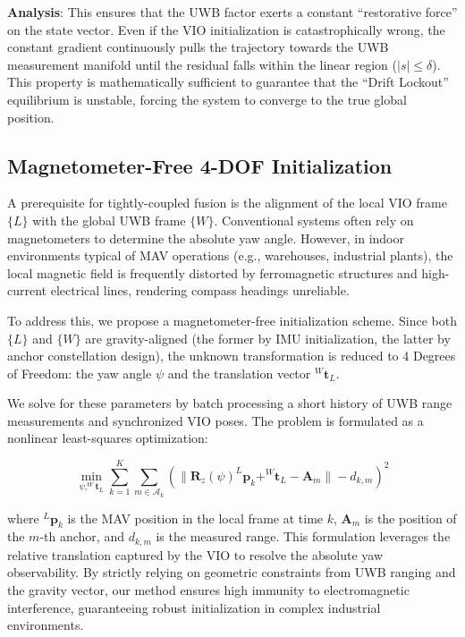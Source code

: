 \documentclass{svproc}
\begin{document}
\textbf{Analysis}: This ensures that the UWB factor exerts a constant ``restorative force'' on the state vector. Even if the VIO initialization is catastrophically wrong, the constant gradient continuously pulls the trajectory towards the UWB measurement manifold until the residual falls within the linear region ($|s| \le \delta$). This property is mathematically sufficient to guarantee that the ``Drift Lockout'' equilibrium is unstable, forcing the system to converge to the true global position.

\subsection{Magnetometer-Free 4-DOF Initialization}

A prerequisite for tightly-coupled fusion is the alignment of the local VIO frame $\{L\}$ with the global UWB frame $\{W\}$. Conventional systems often rely on magnetometers to determine the absolute yaw angle. However, in indoor environments typical of MAV operations (e.g., warehouses, industrial plants), the local magnetic field is frequently distorted by ferromagnetic structures and high-current electrical lines, rendering compass headings unreliable.

To address this, we propose a magnetometer-free initialization scheme. Since both $\{L\}$ and $\{W\}$ are gravity-aligned (the former by IMU initialization, the latter by anchor constellation design), the unknown transformation is reduced to 4 Degrees of Freedom: the yaw angle $\psi$ and the translation vector $^W\mathbf{t}_L$.

We solve for these parameters by batch processing a short history of UWB range measurements and synchronized VIO poses. The problem is formulated as a nonlinear least-squares optimization:

\begin{equation}
\min_{\psi, ^W\mathbf{t}_L} \sum_{k=1}^{K} \sum_{m \in \mathcal{A}_k} \left( \| \mathbf{R}_z(\psi) ^L\mathbf{p}_{k} + ^W\mathbf{t}_L - \mathbf{A}_m \| - d_{k,m} \right)^2
\end{equation}

where $^L\mathbf{p}_{k}$ is the MAV position in the local frame at time $k$, $\mathbf{A}_m$ is the position of the $m$-th anchor, and $d_{k,m}$ is the measured range. This formulation leverages the relative translation captured by the VIO to resolve the absolute yaw observability. By strictly relying on geometric constraints from UWB ranging and the gravity vector, our method ensures high immunity to electromagnetic interference, guaranteeing robust initialization in complex industrial environments.
\end{document}
